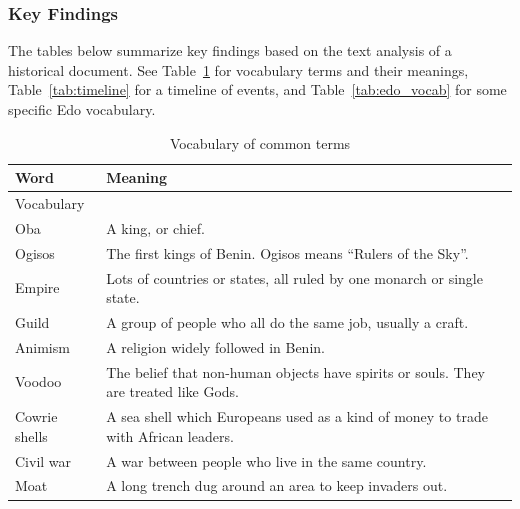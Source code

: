 \subsubsection{Key Findings}
The tables below summarize key findings based on the text analysis of a historical document. See Table~\ref{tab:vocabulary} for vocabulary terms and their meanings, Table~\ref{tab:timeline} for a timeline of events, and Table~\ref{tab:edo_vocab} for some specific Edo vocabulary.

\begin{table}[htb]
\centering
\caption{Vocabulary of common terms}
\label{tab:vocabulary}
\begin{tabularx}{\linewidth}{|l|X|}
\hline
\textbf{Word} & \textbf{Meaning} \\
\hline
Vocabulary & \\
\hline
Oba & A king, or chief. \\
\hline
Ogisos & The first kings of Benin. Ogisos means “Rulers of the Sky”. \\
\hline
Empire & Lots of countries or states, all ruled by one monarch or single state. \\
\hline
Guild & A group of people who all do the same job, usually a craft. \\
\hline
Animism & A religion widely followed in Benin. \\
\hline
Voodoo & The belief that non-human objects have spirits or souls. They are treated like Gods. \\
\hline
Cowrie shells & A sea shell which Europeans used as a kind of money to trade with African leaders. \\
\hline
Civil war & A war between people who live in the same country. \\
\hline
Moat & A long trench dug around an area to keep invaders out. \\
\hline
\end{tabularx}
\end{table}

